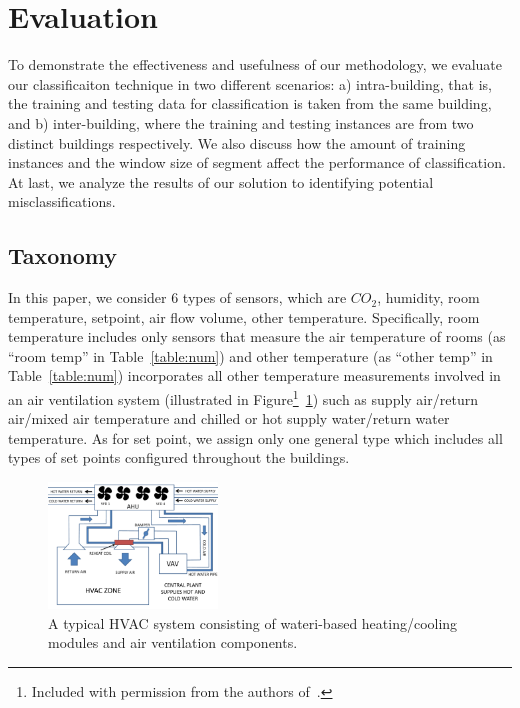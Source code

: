 \section{Evaluation}
To demonstrate the effectiveness and usefulness of our methodology, we evaluate our classificaiton technique in two different scenarios: a) intra-building, that is, the 
training and testing data for classification is taken from the same building, and b) inter-building, where the training and testing instances are from two 
distinct buildings respectively. We also discuss how the amount of training instances and the window size of segment affect the performance of classification.
At last, we analyze the results of our solution to identifying potential misclassifications.

\subsection{Taxonomy}
In this paper, we consider 6 types of sensors, which are $CO_{2}$, humidity, room temperature, setpoint, air flow volume, other temperature. Specifically, room 
temperature includes only sensors that measure the air temperature of rooms (as ``room temp'' in Table~\ref{table:num}) and other temperature (as ``other temp'' 
in Table~\ref{table:num}) incorporates all other temperature measurements involved in an air ventilation system (illustrated in Figure\footnote{Included 
with permission from the authors of~\cite{sentinel}.}~\ref{fig:hvac}) such as supply air/return air/mixed air temperature and chilled or hot supply water/return water temperature. 
As for set point, we assign only one general type which includes all types of set points configured throughout the buildings.

\begin{figure}[ht!]
\centering
\includegraphics[width=0.4\textwidth]{./fig/hvac.pdf}
\caption{A typical HVAC system consisting of wateri-based heating/cooling modules and air ventilation components.}
\label{fig:hvac}
\end{figure}

